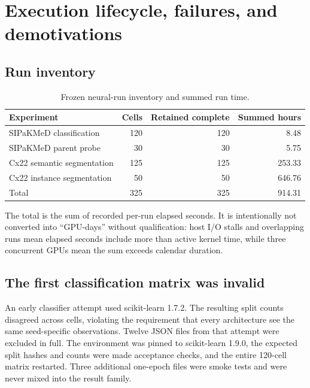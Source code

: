 \chapter{Execution lifecycle, failures, and demotivations}\label{s1:ch:ch13_execution_lifecycle_failures_and_demotiv}

\section{Run inventory}

\begin{table}[H]
\centering
\caption{Frozen neural-run inventory and summed run time.}
\label{s1:tab:inventory}
\begin{tabular}{lrrr}
\toprule
Experiment & Cells & Retained complete & Summed hours \\
\midrule
SIPaKMeD classification & 120 & 120 & 8.48 \\
SIPaKMeD parent probe & 30 & 30 & 5.75 \\
Cx22 semantic segmentation & 125 & 125 & 253.33 \\
Cx22 instance segmentation & 50 & 50 & 646.76 \\
\midrule
Total & 325 & 325 & 914.31 \\
\bottomrule
\end{tabular}
\end{table}

The total is the sum of recorded per-run elapsed seconds. It is intentionally not converted into ``GPU-days'' without qualification: host I/O stalls and overlapping runs mean elapsed seconds include more than active kernel time, while three concurrent GPUs mean the sum exceeds calendar duration.

\section{The first classification matrix was invalid}

An early classifier attempt used scikit-learn 1.7.2. The resulting  split counts disagreed across cells, violating the requirement that every architecture see the same seed-specific observations. Twelve JSON files from that attempt were excluded in full. The environment was pinned to scikit-learn 1.9.0, the expected split hashes and counts were made acceptance checks, and the entire 120-cell matrix restarted. Three additional one-epoch files were smoke tests and were never mixed into the result family.

